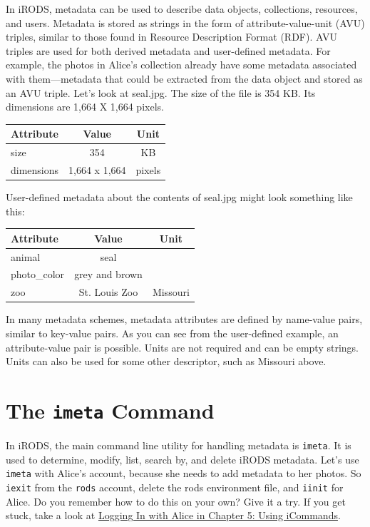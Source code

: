 \documentclass[10pt,oneside]{memoir}
\begin{document}
In iRODS, metadata can be used to describe data objects, collections, resources, and users. Metadata is stored as strings in the form of attribute-value-unit (AVU) triples, similar to those found in Resource Description Format (RDF). AVU triples are used for both derived metadata and user-defined metadata. For example, the photos in Alice's collection already have some metadata associated with them---metadata that could be extracted from the data object and stored as an AVU triple. Let's look at seal.jpg. The size of the file is 354 KB. Its dimensions are 1,664 X 1,664 pixels.

\begin{center}
\begin{tabular}{ |l|c|c| }
 \hline
Attribute & Value & Unit \\
\hline
size & 354 & KB \\
dimensions & 1,664 x 1,664 & pixels \\
 \hline
\end{tabular}
\end{center}

User-defined metadata about the contents of seal.jpg might look something like this:

\begin{center}
\begin{tabular}{ |l|c|c| }
 \hline
Attribute & Value & Unit \\
\hline
animal & seal & \\
photo\_color & grey and brown & \\
zoo & St. Louis Zoo & Missouri \\
 \hline
\end{tabular}
\end{center}

In many metadata schemes, metadata attributes are defined by name-value pairs, similar to key-value pairs. As you can see from the user-defined example, an attribute-value pair is possible. Units are not required and can be empty strings. Units can also be used for some other descriptor, such as Missouri above.

\section{The \texttt{imeta} Command}
In iRODS, the main command line utility for handling metadata is \texttt{imeta}. It is used to determine, modify, list, search by, and delete iRODS metadata. Let's use \texttt{imeta} with Alice's account, because she needs to add metadata to her photos. So \texttt{iexit} from the \texttt{rods} account, delete the rods environment file, and \texttt{iinit} for Alice. Do you remember how to do this on your own? Give it a try. If you get stuck, take a look at \hyperref[sec:logging_in_with_alice]{Logging In with Alice in Chapter 5: Using iCommands}.
\end{document}
